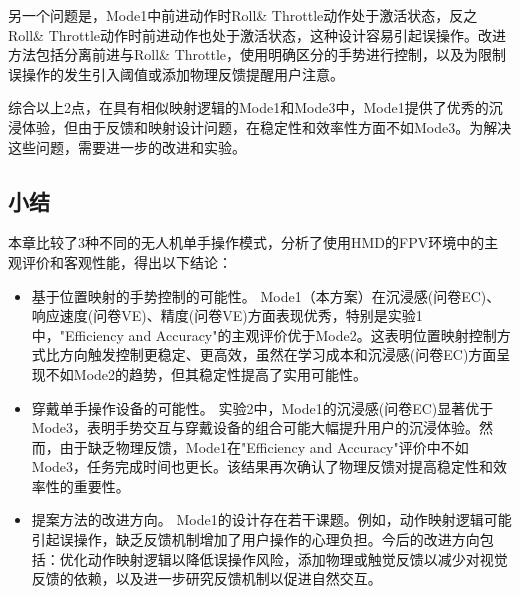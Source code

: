 另一个问题是，Mode1中前进动作时Roll\& Throttle动作处于激活状态，反之Roll\& Throttle动作时前进动作也处于激活状态，这种设计容易引起误操作。改进方法包括分离前进与Roll\& Throttle，使用明确区分的手势进行控制，以及为限制误操作的发生引入阈值或添加物理反馈提醒用户注意。

综合以上2点，在具有相似映射逻辑的Mode1和Mode3中，Mode1提供了优秀的沉浸体验，但由于反馈和映射设计问题，在稳定性和效率性方面不如Mode3。为解决这些问题，需要进一步的改进和实验。

\subsection{小结}

本章比较了3种不同的无人机单手操作模式，分析了使用HMD的FPV环境中的主观评价和客观性能，得出以下结论：

\begin{itemize}
    \item 基于位置映射的手势控制的可能性。
          Mode1（本方案）在沉浸感(问卷EC)、响应速度(问卷VE)、精度(问卷VE)方面表现优秀，特别是实验1中，"Efficiency and Accuracy"的主观评价优于Mode2。这表明位置映射控制方式比方向触发控制更稳定、更高效，虽然在学习成本和沉浸感(问卷EC)方面呈现不如Mode2的趋势，但其稳定性提高了实用可能性。

    \item 穿戴单手操作设备的可能性。
          实验2中，Mode1的沉浸感(问卷EC)显著优于Mode3，表明手势交互与穿戴设备的组合可能大幅提升用户的沉浸体验。然而，由于缺乏物理反馈，Mode1在"Efficiency and Accuracy"评价中不如Mode3，任务完成时间也更长。该结果再次确认了物理反馈对提高稳定性和效率性的重要性。

    \item 提案方法的改进方向。
          Mode1的设计存在若干课题。例如，动作映射逻辑可能引起误操作，缺乏反馈机制增加了用户操作的心理负担。今后的改进方向包括：优化动作映射逻辑以降低误操作风险，添加物理或触觉反馈以减少对视觉反馈的依赖，以及进一步研究反馈机制以促进自然交互。
\end{itemize}

\ifx\allfiles\undefined

\fi

